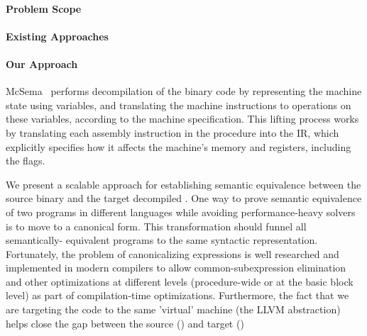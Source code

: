 \paragraph{Problem Scope}


\paragraph{Existing Approaches}

\paragraph{Our Approach}

McSema~\cite{McSema:Recon14} performs decompilation of the binary code by representing the machine state using variables, and translating the machine instructions to operations on these variables, according to the machine specification. This lifting process works by translating each assembly instruction in the procedure into the IR, which explicitly specifies how it affects the machine's memory and registers, including the flags.

We present a scalable approach for establishing semantic equivalence between the source binary and the target decompiled \LLVM.
One way to prove semantic equivalence of two programs in different languages while avoiding performance-heavy solvers is to move to a canonical form. This transformation should funnel all semantically- equivalent programs to the same syntactic representation. Fortunately, the problem of canonicalizing expressions is well researched and implemented in modern compilers to allow common-subexpression elimination and other optimizations at different levels (procedure-wide or at the basic block level) as part of compilation-time optimizations.   
Furthermore, the fact that we are targeting the code to the same 'virtual' machine (the LLVM abstraction) helps close the gap between the source (\ISA) and target (\LLVM)

